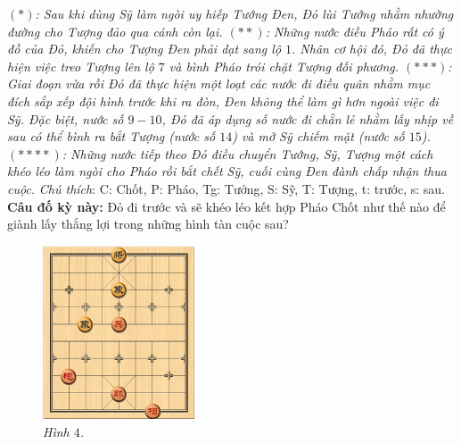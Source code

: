 \begin{multicols}{2}
	\vskip 0.1cm
	\textit{$(*)$: Sau khi dùng Sỹ làm ngòi uy hiếp Tướng Đen, Đỏ lùi Tướng nhằm nhường đường cho Tượng đảo qua cánh còn lại.
	\vskip 0.1cm
	$(**)$: Những nước điều Pháo rất có ý đồ của Đỏ, khiến cho Tượng Đen phải dạt sang lộ $1$. Nhân cơ hội đó, Đỏ đã thực hiện việc treo Tượng lên lộ $7$ và bình Pháo trói chặt Tượng đối phương.
	\vskip 0.1cm
	$(***)$: Giai đoạn vừa rồi Đỏ đã thực hiện một loạt các nước đi điều quân nhằm mục đích sắp xếp đội hình trước khi ra đòn, Đen không thể làm gì hơn ngoài việc đi Sỹ. Đặc biệt, nước số $9-10$, Đỏ đã áp dụng số nước đi chẵn lẻ nhằm lấy nhịp về sau có thể bình ra bắt Tượng (nước số $14$) và mở Sỹ chiếm mặt (nước số $15$).
	\vskip 0.1cm
	$(****)$: Những nước tiếp theo Đỏ điều chuyển Tướng, Sỹ, Tượng một cách khéo léo làm ngòi cho Pháo rồi bắt chết Sỹ, cuối cùng Đen đành chấp nhận thua cuộc.}
	\vskip 0.1cm
	\columnbreak
	\textit{Chú thích}: C: Chốt, P: Pháo, Tg: Tướng, S: Sỹ, T: Tượng, t: trước, s: sau.
	\vskip 0.1cm
	\textbf{\color{gocco}Câu đố kỳ này:} Đỏ đi trước và sẽ khéo léo kết hợp Pháo Chốt như thế nào để giành lấy thắng lợi trong những hình tàn cuộc sau?
	\begin{figure}[H]
		\vspace*{-5pt}
		\centering
		\captionsetup{labelformat= empty, justification=centering}
		\includegraphics[width= 0.4\textwidth]{4}
		\caption{\small\textit{\color{gocco}Hình $4$.}}
		\vspace*{-10pt}
	\end{figure}
	\begin{figure}[H]
		\vspace*{-10pt}

\end{figure}
\end{multicols}
